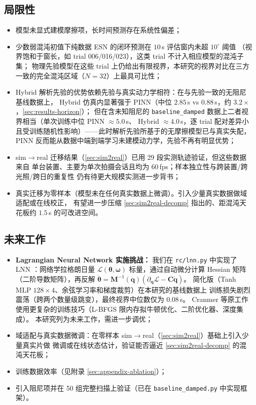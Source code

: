 \documentclass[a4paper,12pt]{ctexart}   %
\let\cite\supercite   %
\begin{document}
\subsection{局限性}
\begin{itemize}[leftmargin=2em]
  \item 模型未显式建模摩擦项，长时间预测存在系统性偏差；
  \item 少数弱混沌初值下纯数据 ESN 的闭环预测在 $10$\,s 评估窗内未超 $10^\circ$ 阈值
        （视界饱和于窗长，如 trial 006/016/023），这类 trial 不计入相应模型的混沌子集；
        物理先验模型在这些 trial 上仍给出有限视界，本研究的视界对比在三方一致的完全混沌区域（$N = 32$）上最具可比性；
  \item Hybrid 解析先验的优势依赖先验与真实动力学相符：在与先验一致的无阻尼基线数据上，
        Hybrid 仿真内显著强于 PINN（中位 $2.85$\,s vs $0.88$\,s，约 $3.2\times$，\cref{sec:results-horizon}）；
        但在含未知阻尼的 \texttt{baseline\_damped} 数据上二者视界相当（单次训练中位 PINN $\approx 5.0$\,s、
        Hybrid $\approx 4.0$\,s，逐 trial 配对差异小且受训练随机性影响）——此时解析先验所基于的无摩擦模型已与真实失配，
        PINN 反而能从数据中端到端学习未建模动力学，先验不再有明显优势；
  \item sim$\to$real 迁移结果（\cref{sec:sim2real}）已用 29 段实测轨迹验证，但这些数据来自
        单台装置、主要为单次拍摄会话且均为 60\,fps；样本独立性与跨装置/跨光照/跨日的重复性
        仍有待更大规模实测进一步背书；
  \item 真实迁移为零样本（模型未在任何真实数据上微调）。引入少量真实数据做域适配或在线校正，
        有望进一步压缩 \cref{sec:sim2real-decomp} 指出的、距混沌天花板约 $1.5$\,s 的可改进空间。
\end{itemize}

\subsection{未来工作}
\begin{itemize}[leftmargin=2em]
  \item \textbf{Lagrangian Neural Network 实施挑战：} 我们在 \texttt{rc/lnn.py}
        中实现了 LNN \cite{cranmer2020}：网络学拉格朗日量 $\mathcal{L}(\bm{\theta}, \bm{\omega})$
        标量，通过自动微分计算 Hessian 矩阵（二阶导数矩阵），再反解 $\ddot{\bm{\theta}} = \bm{M}^{-1}(\bm{q})(\partial_{\bm{q}} \mathcal{L} - \bm{C} \dot{\bm{q}})$。
        简化版（Tanh MLP $128 \times 4$、余弦学习率和梯度裁剪）在本研究的基线数据上
        训练损失剧烈震荡（跨两个数量级跳变），最终视界中位数仅为 $0.08$\,s。
        Cranmer 等原工作使用更复杂的训练技巧（L-BFGS 限内存拟牛顿优化、二阶优化器、深度集成）。
        本研究列为未来工作，需进一步调优；
  \item 域适配与真实数据微调：在零样本 sim$\to$real（\cref{sec:sim2real}）基础上引入少量真实片做
        微调或在线状态估计，验证能否逼近 \cref{sec:sim2real-decomp} 的混沌天花板；
  \item 训练数据效率（见附录 \cref{sec:appendix-ablation}）；
  \item 引入阻尼项并在 50 组完整扫描上验证（已在 \texttt{baseline\_damped.py} 中实现框架）。
\end{itemize}
\end{document}
